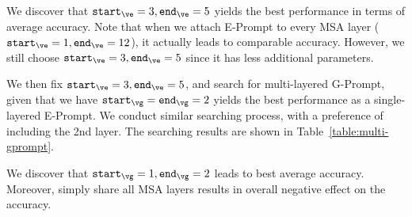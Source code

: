 \documentclass[runningheads]{llncs}
\newcommand{\gprompt}{G-Prompt\xspace}
\newcommand{\eprompt}{E-Prompt\xspace}
\def \iep{\texttt{start}_{\ve}}
\def \jep{\texttt{end}_{\ve}}
\def \igp{\texttt{start}_{\vg}}
\def \jgp{\texttt{end}_{\vg}}
\begin{document}
We discover that $\iep = 3, \jep = 5$ yields the best performance in terms of average accuracy. Note that when we attach \eprompt to every MSA layer ($\iep = 1, \jep = 12$), it actually leads to comparable accuracy. However, we still choose $\iep = 3, \jep = 5$ since it has less additional parameters.

We then fix $\iep = 3, \jep = 5$, and search for multi-layered \gprompt, given that we have $\igp = \jgp = 2$ yields the best performance as a single-layered \eprompt. We conduct similar searching process, with a preference of including the 2nd layer. The searching results are shown in Table~\ref{table:multi-gprompt}.

We discover that $\igp = 1, \jgp = 2$ leads to best average accuracy. Moreover, simply share all MSA layers results in overall negative effect on the accuracy.
\end{document}
